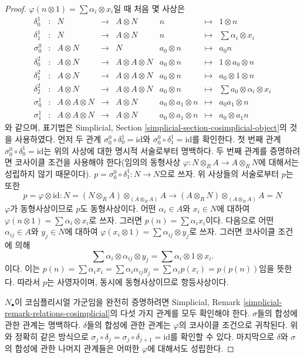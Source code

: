 \begin{proof}
$\varphi(n \otimes 1) = \sum \alpha_i \otimes x_i$일 때 처음 몇 사상은
$$
\begin{matrix}
\delta^1_0 & : & N & \to & A \otimes N & n & \mapsto & 1 \otimes n \\
\delta^1_1 & : & N & \to & A \otimes N & n & \mapsto &
\sum \alpha_i \otimes x_i\\
\sigma^0_0 & : & A \otimes N & \to & N & a_0 \otimes n & \mapsto & a_0n \\
\delta^2_0 & : & A \otimes N & \to & A \otimes A \otimes N &
a_0 \otimes n & \mapsto & 1 \otimes a_0 \otimes n \\
\delta^2_1 & : & A \otimes N & \to & A \otimes A \otimes N &
a_0 \otimes n & \mapsto & a_0 \otimes 1 \otimes n \\
\delta^2_2 & : & A \otimes N & \to & A \otimes A \otimes N &
a_0 \otimes n & \mapsto & \sum a_0 \otimes \alpha_i \otimes x_i \\
\sigma^1_0 & : & A \otimes A \otimes N & \to & A \otimes N &
a_0 \otimes a_1 \otimes n & \mapsto & a_0a_1 \otimes n \\
\sigma^1_1 & : & A \otimes A \otimes N & \to & A \otimes N &
a_0 \otimes a_1 \otimes n & \mapsto & a_0 \otimes a_1n
\end{matrix}
$$
와 같으며, 표기법은 Simplicial, Section
\ref{simplicial-section-cosimplicial-object}의 것을 사용하였다.
먼저 두 관계 $\sigma^0_0 \circ \delta^1_0 = \text{id}$와
$\sigma^0_0 \circ \delta^1_1 = \text{id}$를 확인한다.
첫 번째 관계 $\sigma^0_0 \circ \delta^1_0 = \text{id}$는 위의 사상에 대한
명시적 서술로부터 명백하다.
두 번째 관계를 증명하려면 코사이클 조건을 사용해야 한다(임의의 동형사상
$\varphi : N \otimes_R A \to A \otimes_R N$에 대해서는 성립하지 않기
때문이다). $p = \sigma^0_0 \circ \delta^1_1 : N \to N$으로 쓰자.
위 사상들의 서술로부터 $p$는 또한
$$
p = \varphi \otimes \text{id} :
N = (N \otimes_R A) \otimes_{(A \otimes_R A)} A
\longrightarrow
(A \otimes_R N) \otimes_{(A \otimes_R A)} A = N
$$
$\varphi$가 동형사상이므로 $p$도 동형사상이다. 어떤
$\alpha_i \in A$와 $x_i \in N$에 대하여
$\varphi(n \otimes 1) = \sum \alpha_i \otimes x_i$로 쓰자. 그러면
$p(n) = \sum \alpha_ix_i$이다. 다음으로 어떤 $\alpha_{ij} \in A$와
$y_j \in N$에 대하여
$\varphi(x_i \otimes 1) = \sum \alpha_{ij} \otimes y_j$로 쓰자.
그러면 코사이클 조건에 의해
$$
\sum \alpha_i \otimes \alpha_{ij} \otimes y_j
=
\sum \alpha_i \otimes 1 \otimes x_i.
$$
이다. 이는 $p(n) = \sum \alpha_ix_i = \sum \alpha_i\alpha_{ij}y_j =
\sum \alpha_i p(x_i) = p(p(n))$임을 뜻한다. 따라서 $p$는 사영자이며,
동시에 동형사상이므로 항등사상이다.

\medskip\noindent
$N_\bullet$이 코심플리시얼 가군임을 완전히 증명하려면 Simplicial, Remark
\ref{simplicial-remark-relations-cosimplicial}의 다섯 가지 관계를 모두
확인해야 한다. $\sigma$들의 합성에 관한 관계는 명백하다. $\delta$들의
합성에 관한 관계는 $\varphi$의 코사이클 조건으로 귀착된다. 위와 정확히
같은 방식으로
$\sigma_j \circ \delta_j = \sigma_j \circ \delta_{j + 1} = \text{id}$를
확인할 수 있다. 마지막으로 $\delta$와 $\sigma$의 합성에 관한 나머지
관계들은 어떠한 $\varphi$에 대해서도 성립한다.
\end{proof}


